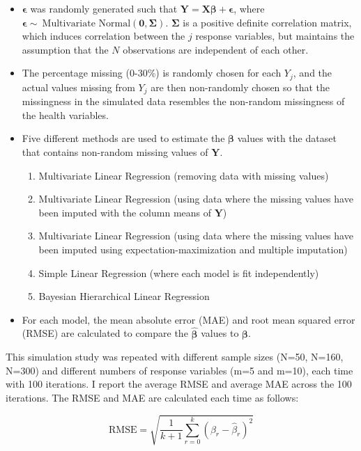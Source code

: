 \begin{itemize}
\item $\boldsymbol{\epsilon}$ was randomly generated such that $\mathbf{Y}=\mathbf{X}\boldsymbol{\beta}+\boldsymbol{\epsilon}$, where $\boldsymbol{\epsilon}\sim\ \text{Multivariate Normal}(\mathbf{0},\boldsymbol{\Sigma})$. $\boldsymbol{\Sigma}$ is a positive definite correlation matrix, which induces correlation between the $j$ response variables, but maintains the assumption that the $N$ observations are independent of each other.
\item The percentage missing (0-30\%) is randomly chosen for each $Y_j$, and the actual values missing from $Y_j$ are then non-randomly chosen so that the missingness in the simulated data resembles the non-random missingness of the health variables. 
\item Five different methods are used to estimate the $\boldsymbol{\beta}$ values with the dataset that contains non-random missing values of $\boldsymbol{Y}$.
\begin{enumerate}
\item Multivariate Linear Regression (removing data with missing values)
\item Multivariate Linear Regression (using data where the missing values have been imputed with the column means of $\mathbf{Y}$)
\item Multivariate Linear Regression (using data where the missing values have been imputed using expectation-maximization and multiple imputation)
\item Simple Linear Regression (where each model is fit independently)
\item Bayesian Hierarchical Linear Regression 
\end{enumerate}
\item For each model, the mean absolute error (MAE) and root mean squared error (RMSE) are calculated to compare the $\boldsymbol{\hat{\beta}}$ values to $\boldsymbol{\beta}$.
\end{itemize}

This simulation study was repeated with different sample sizes (N=50, N=160, N=300) and different numbers of response variables (m=5 and m=10), each time with 100 iterations. I report the average RMSE and average MAE across the 100 iterations. The RMSE and MAE are calculated each time as follows:

\begin{equation}
\text{RMSE} = \sqrt{\frac{1}{k+1}\sum_{r=0}^{k} (\beta_r - \hat{\beta}_r)^2 }
\end{equation}

